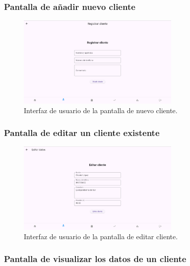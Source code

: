 \subsubsection{Pantalla de añadir nuevo cliente}

\begin{figure}[H]
	\centering
	\includegraphics[width=0.7\textwidth]{imagenes/PrimeraIteracion/nuevoCliente.png}
	\caption{Interfaz de usuario de la pantalla de nuevo cliente.}
	\label{fig:appNuevoCliente}
\end{figure}

\subsubsection{Pantalla de editar un cliente existente}

\begin{figure}[H]
	\centering
	\includegraphics[width=0.7\textwidth]{imagenes/PrimeraIteracion/editarCliente.png}
	\caption{Interfaz de usuario de la pantalla de editar cliente.}
	\label{fig:appEditarCliente}
\end{figure}

\subsubsection{Pantalla de visualizar los datos de un cliente}


